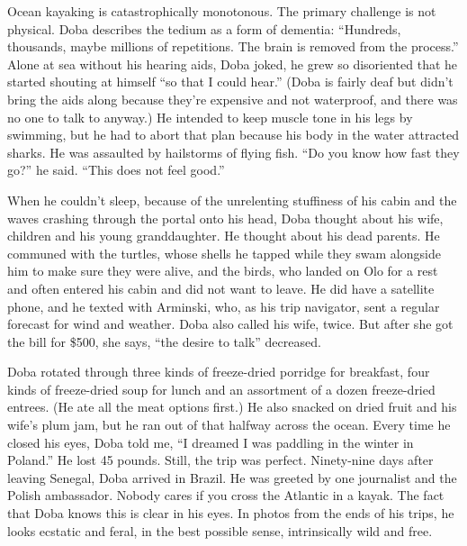 Ocean kayaking is catastrophically monotonous. The primary challenge is
not physical. Doba describes the tedium as a form of dementia:
``Hundreds, thousands, maybe millions of repetitions. The brain is
removed from the process.'' Alone at sea without his hearing aids, Doba
joked, he grew so disoriented that he started shouting at himself ``so
that I could hear.'' (Doba is fairly deaf but didn't bring the aids
along because they're expensive and not waterproof, and there was no one
to talk to anyway.) He intended to keep muscle tone in his legs by
swimming, but he had to abort that plan because his body in the water
attracted sharks. He was assaulted by hailstorms of flying fish. ``Do
you know how fast they go?'' he said. ``This does not feel good.''

When he couldn't sleep, because of the unrelenting stuffiness of his
cabin and the waves crashing through the portal onto his head, Doba
thought about his wife, children and his young granddaughter. He thought
about his dead parents. He communed with the turtles, whose shells he
tapped while they swam alongside him to make sure they were alive, and
the birds, who landed on Olo for a rest and often entered his cabin and
did not want to leave. He did have a satellite phone, and he texted with
Arminski, who, as his trip navigator, sent a regular forecast for wind
and weather. Doba also called his wife, twice. But after she got the
bill for \$500, she says, ``the desire to talk'' decreased.

Doba rotated through three kinds of freeze-dried porridge for breakfast,
four kinds of freeze-dried soup for lunch and an assortment of a dozen
freeze-dried entrees. (He ate all the meat options first.) He also
snacked on dried fruit and his wife's plum jam, but he ran out of that
halfway across the ocean. Every time he closed his eyes, Doba told me,
``I dreamed I was paddling in the winter in Poland.'' He lost 45 pounds.
Still, the trip was perfect. Ninety-nine days after leaving Senegal,
Doba arrived in Brazil. He was greeted by one journalist and the Polish
ambassador. Nobody cares if you cross the Atlantic in a kayak. The fact
that Doba knows this is clear in his eyes. In photos from the ends of
his trips, he looks ecstatic and feral, in the best possible sense,
intrinsically wild and free.

\hypertarget{-1}{%
\subsection{}\label{-1}}


